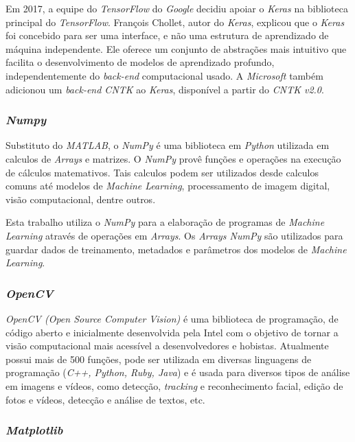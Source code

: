 Em 2017, a equipe do \textit{TensorFlow} do \textit{Google} decidiu apoiar o \textit{Keras} na biblioteca principal do \textit{TensorFlow}. François Chollet, autor do \textit{Keras}, explicou que o \textit{Keras} foi concebido para ser uma interface, e não uma estrutura de aprendizado de máquina independente. Ele oferece um conjunto de abstrações mais intuitivo que facilita o desenvolvimento de modelos de aprendizado profundo, independentemente do \textit{back-end} computacional usado. A \textit{Microsoft} também adicionou um \textit{back-end CNTK} ao \textit{Keras}, disponível a partir do \textit{CNTK v2.0}.

\subsubsection{\textit{Numpy}}

Substituto do \textit{MATLAB}, o \textit{NumPy} é uma biblioteca em \textit{Python} utilizada em calculos de \textit{Arrays} e matrizes. O \textit{NumPy} provê funções e operações na execução de cálculos matemativos. Tais calculos podem ser utilizados desde calculos comuns até modelos de \textit{Machine Learning}, processamento de imagem digital, visão computacional, dentre outros. 

Esta trabalho utiliza o \textit{NumPy} para a elaboração de programas de \textit{Machine Learning} através de operações em \textit{Arrays}. Os \textit{Arrays NumPy} são utilizados para guardar dados de treinamento, metadados e parâmetros dos modelos de \textit{Machine Learning}.

\subsubsection{\textit{OpenCV}}

\textit{OpenCV (Open Source Computer Vision)} é uma biblioteca de programação, de código aberto e inicialmente desenvolvida pela Intel com o objetivo de tornar a visão computacional mais acessível a desenvolvedores e hobistas. Atualmente possui mais de 500 funções, pode ser utilizada em diversas linguagens de programação (\textit{C++, Python, Ruby, Java}) e é usada para diversos tipos de análise em imagens e vídeos, como  detecção, \textit{tracking} e reconhecimento facial, edição de fotos e vídeos, detecção e análise de textos, etc. 

\subsubsection{\textit{Matplotlib}}

